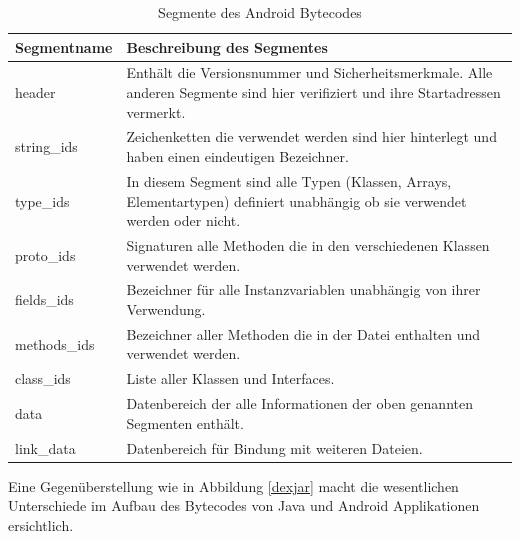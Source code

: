 \begin{table}[h!p]
\begin{tabular}{|p{3cm}|p{11cm}|}\hline

   \textbf{Segmentname} & \textbf{Beschreibung des Segmentes} \\ \hline

   header & Enthält die Versionsnummer und Sicherheitsmerkmale. Alle anderen Segmente sind hier verifiziert und ihre Startadressen vermerkt. \\ \hline

   string\_ids & Zeichenketten die verwendet werden sind hier hinterlegt und haben einen eindeutigen Bezeichner. \\ \hline

   type\_ids & In diesem Segment sind alle Typen (Klassen, Arrays, Elementartypen) definiert unabhängig ob sie verwendet werden oder nicht. \\ \hline

   proto\_ids & Signaturen alle Methoden die in den verschiedenen Klassen verwendet werden. \\ \hline

   fields\_ids & Bezeichner für alle Instanzvariablen unabhängig von ihrer Verwendung. \\ \hline

   methods\_ids & Bezeichner aller Methoden die in der Datei enthalten und verwendet werden. \\ \hline

   class\_ids & Liste aller Klassen und Interfaces.\\ \hline

   data & Datenbereich der alle Informationen der oben genannten Segmenten enthält.\\ \hline
   
   link\_data & Datenbereich für Bindung mit weiteren Dateien. \\ \hline
  
\end{tabular}
\caption{Segmente des Android Bytecodes \cite{eiddvm}}
\label{segand}
\end{table} 
 
 Eine Gegenüberstellung wie in Abbildung \ref{dexjar} macht die wesentlichen Unterschiede im Aufbau des Bytecodes von Java und Android Applikationen ersichtlich.
 
